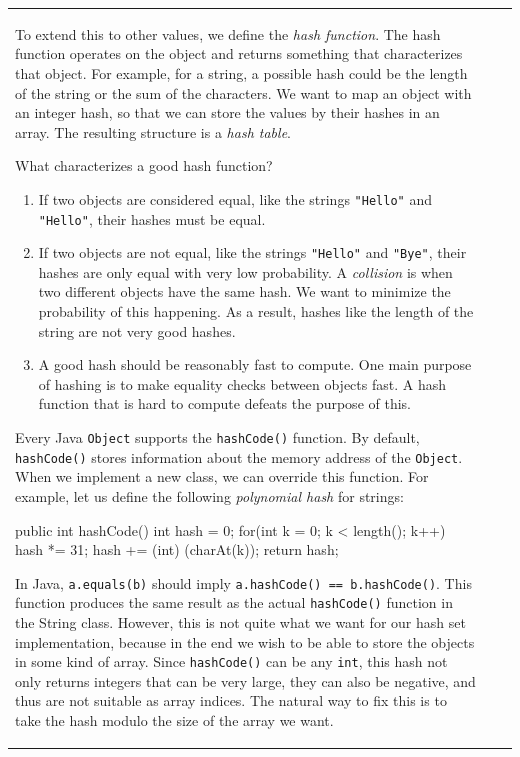 \begin{center}
\begin{tabular}{ | p{5cm} | p{5cm} | p{5cm} | }
To extend this to other values, we define the \textit{hash function}. The hash function operates on the object and returns something that characterizes that object. For example, for a string, a possible hash could be the length of the string or the sum of the characters. We want to map an object with an integer hash, so that we can store the values by their hashes in an array. The resulting structure is a \textit{hash table}.

What characterizes a good hash function?

\begin{enumerate}
\item
If two objects are considered equal, like the strings \texttt{"Hello"} and \texttt{"Hello"}, their hashes must be equal.
\item
If two objects are not equal, like the strings \texttt{"Hello"} and \texttt{"Bye"}, their hashes are only equal with very low probability. A \textit{collision} is when two different objects have the same hash. We want to minimize the probability of this happening. As a result, hashes like the length of the string are not very good hashes.
\item
A good hash should be reasonably fast to compute. One main purpose of hashing is to make equality checks between objects fast. A hash function that is hard to compute defeats the purpose of this.
\end{enumerate}

Every Java \texttt{Object} supports the \texttt{hashCode()} function. By default, \texttt{hashCode()} stores information about the memory address of the \texttt{Object}. When we implement a new class, we can override this function. For example, let us define the following \textit{polynomial hash} for strings:

\begin{mylstlisting}
public int hashCode() {
	int hash = 0;
    for(int k = 0; k < length(); k++) {
		hash *= 31;
        hash += (int) (charAt(k));
    }
    return hash;
}
\end{mylstlisting}

In Java, \texttt{a.equals(b)} should imply \texttt{a.hashCode() == b.hashCode()}. This function produces the same result as the actual \texttt{hashCode()} function in the String class. However, this is not quite what we want for our hash set implementation, because in the end we wish to be able to store the objects in some kind of array. Since \texttt{hashCode()} can be any \texttt{int}, this hash not only returns integers that can be very large, they can also be negative, and thus are not suitable as array indices. The natural way to fix this is to take the hash modulo the size of the array we want.


\end{tabular}
\end{center}

